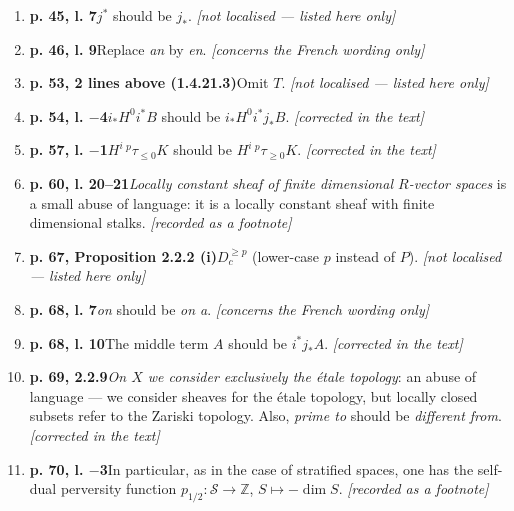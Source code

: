 \documentclass[12pt,oneside]{amsbook}
\theoremstyle{plain}
\theoremstyle{definition}
\renewcommand{\SS}{\mathcal{S}}
\newcommand{\ZZ}{\mathbb{Z}}  \newcommand{\QQ}{\mathbb{Q}}
\DeclareMathOperator{\dimm}{dim}
\begin{document}
\begin{enumerate}[label={\arabic*.},leftmargin=2.6em,itemsep=4pt]
\item \textbf{p. 45, l. 7}\quad $j^{*}$ should be $j_{*}$. \hfill\newline \textsl{[not localised --- listed here only]}
\item \textbf{p. 46, l. 9}\quad Replace \emph{an} by \emph{en}. \hfill\newline \textsl{[concerns the French wording only]}
\item \textbf{p. 53, 2 lines above (1.4.21.3)}\quad Omit $T$. \hfill\newline \textsl{[not localised --- listed here only]}
\item \textbf{p. 54, l. $-$4}\quad $i_{*}H^{0}i^{*}B$ should be $i_{*}H^{0}i^{*}j_{*}B$. \hfill\newline \textsl{[corrected in the text]}
\item \textbf{p. 57, l. $-$1}\quad $H^{i}\,{}^{p}\tau_{\leq0}K$ should be $H^{i}\,{}^{p}\tau_{\geq0}K$. \hfill\newline \textsl{[corrected in the text]}
\item \textbf{p. 60, l. 20--21}\quad \emph{Locally constant sheaf of finite dimensional $R$-vector spaces} is a small abuse of language: it is a locally constant sheaf with finite dimensional stalks. \hfill\newline \textsl{[recorded as a footnote]}
\item \textbf{p. 67, Proposition 2.2.2 (i)}\quad $D_{c}^{\geq p}$ (lower-case $p$ instead of $P$). \hfill\newline \textsl{[not localised --- listed here only]}
\item \textbf{p. 68, l. 7}\quad \emph{on} should be \emph{on a}. \hfill\newline \textsl{[concerns the French wording only]}
\item \textbf{p. 68, l. 10}\quad The middle term $A$ should be $i^{*}j_{*}A$. \hfill\newline \textsl{[corrected in the text]}
\item \textbf{p. 69, 2.2.9}\quad \emph{On $X$ we consider exclusively the étale topology}: an abuse of language --- we consider sheaves for the étale topology, but locally closed subsets refer to the Zariski topology. Also, \emph{prime to} should be \emph{different from}. \hfill\newline \textsl{[corrected in the text]}
\item \textbf{p. 70, l. $-$3}\quad In particular, as in the case of stratified spaces, one has the self-dual perversity function $p_{1/2}:\SS\to\ZZ$, $S\mapsto-\dimm S$. \hfill\newline \textsl{[recorded as a footnote]}

\end{enumerate}
\end{document}
